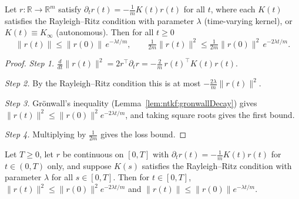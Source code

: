 \begin{theorem}\label{thm:ntkgf:expDecay}
  \leanok
Let $r:\mathbb R\to\mathbb R^m$ satisfy $\partial_tr(t)=-\frac1mK(t)r(t)$ for all $t$, where each $K(t)$ satisfies the Rayleigh--Ritz condition
with parameter $\lambda$ (time-varying kernel), or $K(t)\equiv K_\infty$ (autonomous). Then for all $t\ge0$
\[
  \|r(t)\|\le\|r(0)\|\,e^{-\lambda t/m},\qquad
  \tfrac1{2m}\|r(t)\|^2\le\tfrac1{2m}\|r(0)\|^2\,e^{-2\lambda t/m}.
\]
\end{theorem}

\begin{proof}
  \leanok
\emph{Step 1.} $\frac{d}{dt}\|r(t)\|^2=2r^\top\partial_tr=-\frac2m\,r(t)^\top K(t)r(t)$.

\emph{Step 2.} By the Rayleigh--Ritz condition this is at most $-\frac{2\lambda}{m}\|r(t)\|^2$.

\emph{Step 3.} Gr\"onwall's inequality (Lemma~\ref{lem:ntkf:gronwallDecay}) gives $\|r(t)\|^2\le\|r(0)\|^2e^{-2\lambda t/m}$, and taking square roots gives the first bound.

\emph{Step 4.} Multiplying by $\frac1{2m}$ gives the loss bound.
\end{proof}

\begin{theorem}\label{thm:ntkgf:expDecayIcc}
  \leanok
Let $T\ge0$, let $r$ be continuous on $[0,T]$ with $\partial_tr(t)=-\frac1mK(t)r(t)$ for $t\in(0,T)$ only, and suppose $K(s)$ satisfies the
Rayleigh--Ritz condition with parameter $\lambda$ for all $s\in[0,T]$. Then for $t\in[0,T]$,
$\|r(t)\|^2\le\|r(0)\|^2e^{-2\lambda t/m}$ and $\|r(t)\|\le\|r(0)\|e^{-\lambda t/m}$.
\end{theorem}

